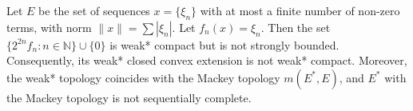 Let $E$ be the set of sequences $x = \{\xi_n\}$ with at most a finite number of non-zero terms, with norm $\|x\| = \sum |\xi_n|$. Let $f_n(x) = \xi_n$. Then the set $\{2^{2n}f_n : n \in \mathbb{N}\} \cup \{0\}$ is weak* compact but is not strongly bounded. Consequently, its weak* closed convex extension is not weak* compact. Moreover, the weak* topology coincides with the Mackey topology $m(E^*, E)$, and $E^*$ with the Mackey topology is not sequentially complete.
